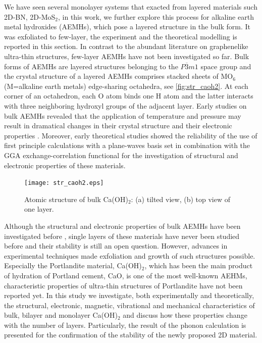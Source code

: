We have seen several monolayer systems that exacted from layered materials such 2D-BN, 2D-MoS$_2$, in this work, we further explore this process for alkaline earth metal hydroxides (AEMHs), which pose a layered structure in the bulk form. It was exfoliated  to few-layer, the experiment and the theoretical modelling is reported in this section. In contrast to the abundant literature on graphenelike ultra-thin structures, few-layer AEMHs have not been investigated so far. Bulk forms of AEMHs are layered structures belonging to the $P\overline{3}m1$ space group\cite{structure1} and the crystal structure of a layered AEMHs comprises stacked sheets of MO$_6$ (M=alkaline earth metals) edge-sharing octahedra, see \autoref{fig:str_caoh2}. At each corner of an octahedron, each O atom binds one H atom and the latter interacts with three neighboring hydroxyl groups of the adjacent layer. Early studies on bulk AEMHs revealed that the application of temperature and pressure may result in dramatical changes in their crystal structure and their electronic properties\cite{amorphization1,amorphization2,amorphization3,amorphization4,transition1,transition2,transition3,transition4} . Moreover, early theoretical studies showed the reliability of the use of first principle calculations with a plane-waves basis set in combination with the GGA exchange-correlation functional for the investigation of structural and electronic properties of these materials\cite{Winkler1995,Baranek2001,Azuma2011,DArco1993}.

\begin{figure}
\centering
\texttt{[image: str\_caoh2.eps]}
\caption{\label{fig:str_caoh2} Atomic structure of bulk Ca(OH)$_2$: (a)
tilted view, (b) top view of one layer. }
\end{figure}

Although the structural and electronic properties of bulk AEMHs have been
investigated before \cite{Azuma2011,Pishtshev,Pishtshev1} , single layers of 
these materials have never been studied before and their stability is 
still an open question. However, advances 
in experimental techniques made exfoliation and growth of such 
structures possible\cite{new1,new2}. Especially the Portlandite material, Ca(OH)$_2$,
which has been the 
main product of hydration of Portland cement, CaO, is one of the most well-known 
AEHMs, characteristic properties of ultra-thin structures of Portlandite have 
not been reported yet. In this study we investigate, both experimentally and theoretically, 
the structural, electronic, magnetic, vibrational and mechanical 
characteristics of bulk, bilayer and monolayer Ca(OH)$_{2}$ and discuss how these properties change with the number of layers.  Particularly, the result of the phonon calculation is presented for the confirmation of the stability of the newly proposed 2D material.

